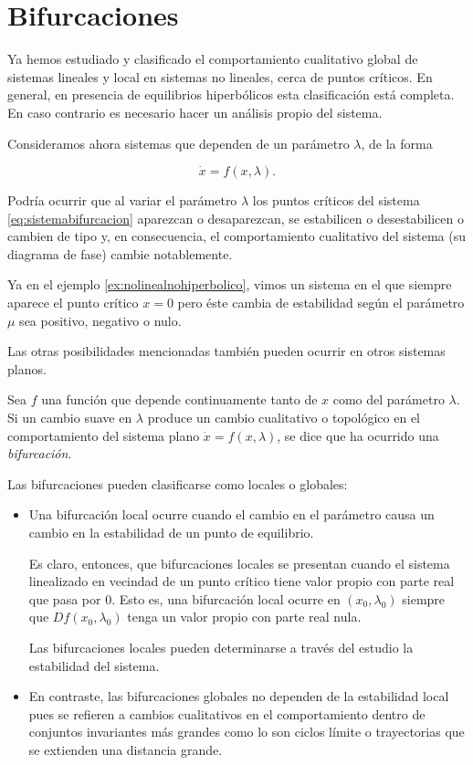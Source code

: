 \chapter{Bifurcaciones}
Ya hemos estudiado y clasificado el comportamiento cualitativo global de sistemas lineales y local en sistemas no lineales, cerca de puntos críticos. En general, en presencia de equilibrios hiperbólicos esta clasificación está completa. En caso contrario es necesario hacer un análisis propio del sistema.

Consideramos ahora sistemas que dependen de un parámetro $\lambda$, de la forma

\begin{equation} \label{eq:sistemabifurcacion}
	\dot{x} = f(x, \lambda).
\end{equation}

Podría ocurrir que al variar el parámetro $\lambda$ los puntos críticos del sistema \ref{eq:sistemabifurcacion} aparezcan o desaparezcan, se estabilicen o desestabilicen o cambien de tipo y, en consecuencia, el comportamiento cualitativo del sistema (su diagrama de fase) cambie notablemente.

Ya en el ejemplo \ref{ex:nolinealnohiperbolico}, vimos un sistema en el que siempre aparece el punto crítico $x = 0$ pero éste cambia de estabilidad según el parámetro $\mu$ sea positivo, negativo o nulo.

Las otras posibilidades mencionadas también pueden ocurrir en otros sistemas planos.

\begin{definition} \label{def:bifurcacion}
Sea $f$ una función que depende continuamente tanto de $x$ como del parámetro $\lambda$. Si un cambio suave en $\lambda$ produce un cambio cualitativo o topológico en el comportamiento del sistema plano $\dot{x} = f(x,\lambda)$, se dice que ha ocurrido una \emph{bifurcación}.
\end{definition}

Las bifurcaciones pueden clasificarse como locales o globales:
\begin{itemize}
	\item Una bifurcación local ocurre cuando el cambio en el parámetro causa un cambio en la estabilidad de un punto de equilibrio.

	Es claro, entonces, que bifurcaciones locales se presentan cuando el sistema linealizado en vecindad de un punto crítico tiene valor propio con parte real que pasa por $0$.
	Esto es, una bifurcación local ocurre en $(x_0, \lambda_0)$ siempre que $Df(x_0, \lambda_0)$ tenga un valor propio con parte real nula.

	Las bifurcaciones locales pueden determinarse a través del estudio la estabilidad del sistema.

	\item En contraste, las bifurcaciones globales no dependen de la estabilidad local pues se refieren a cambios cualitativos en el comportamiento dentro de conjuntos invariantes más grandes como lo son ciclos límite o trayectorias que se extienden una distancia grande.
\end{itemize}

